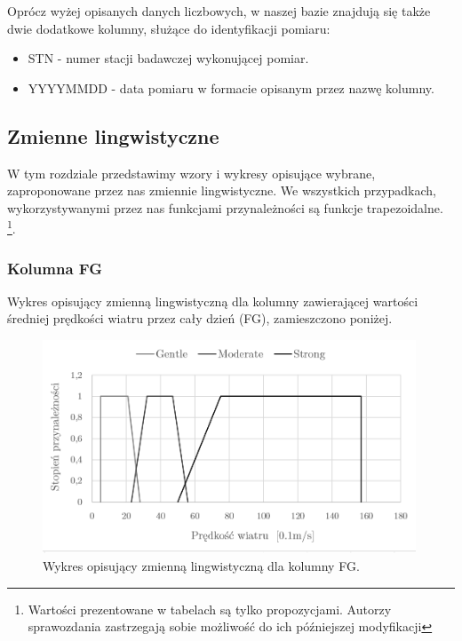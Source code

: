 \documentclass{classrep}
\begin{document}
Oprócz wyżej opisanych danych liczbowych, w naszej bazie znajdują się także dwie dodatkowe kolumny, służące do identyfikacji pomiaru:
\begin{itemize}[label=$\bullet$\scshape\bfseries]
\item STN - numer stacji badawczej wykonującej pomiar.
\item YYYYMMDD - data pomiaru w formacie opisanym przez nazwę kolumny.
\end{itemize}




\subsection{Zmienne lingwistyczne}
W tym rozdziale przedstawimy wzory i wykresy opisujące wybrane, zaproponowane przez nas zmiennie lingwistyczne. We wszystkich przypadkach, wykorzystywanymi przez nas funkcjami przynależności są funkcje trapezoidalne.  \footnote{Wartości prezentowane w tabelach są tylko propozycjami. Autorzy sprawozdania zastrzegają sobie możliwość do ich późniejszej modyfikacji}.\newline

\clearpage



\subsubsection{Kolumna FG}
Wykres opisujący zmienną lingwistyczną dla kolumny zawierającej wartości średniej prędkości wiatru przez cały dzień (FG), zamieszczono poniżej.
\begin{figure}[H]
	\centering
	\includegraphics[width=0.99\textwidth]{Pictures/TermsCharts/FG.png}
	\caption{Wykres opisujący zmienną lingwistyczną dla kolumny FG.}
\end{figure}
\end{document}
